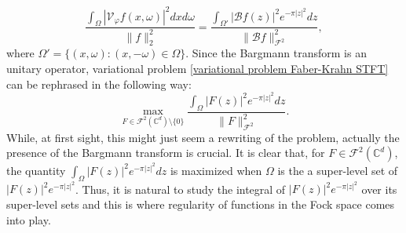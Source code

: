 \documentclass[corpo=11pt, stile=classica, tipotesi=custom,
greek, evenboxes, english]{toptesi}
\numberwithin{equation}{chapter}
\theoremstyle{definition}
\theoremstyle{remark}
\newcommand{\V}{\mathcal{V}} %
\newcommand{\Fock}{\mathcal{F}} %
\newcommand{\C}{\mathbb{C}} %
\newcommand{\Barg}{\mathcal{B}} %
\begin{document}
\begin{equation*}
	\dfrac{\int_{\Omega} |\V_{\varphi} f(x,\omega)|^2 dx d\omega }{\|f\|_2^2} = \dfrac{\int_{\Omega'} |\Barg f (z)|^2 e^{-\pi |z|^2}dz }{\|\Barg f\|_{\Fock^2}^2},
\end{equation*}
where $\Omega' = \{(x, \omega) : (x, -\omega) \in \Omega\}$. Since the Bargmann transform is an unitary operator, variational problem \eqref{variational problem Faber-Krahn STFT} can be rephrased in the following way:
\begin{equation*}
	\max_{F \in \Fock^2(\C^d) \setminus \{0\}} \dfrac{\int_{\Omega} |F(z)|^2 e^{-\pi |z|^2}dz}{\|F\|_{\Fock^2}^2}.
\end{equation*}
While, at first sight, this might just seem a rewriting of the problem, actually the presence of the Bargmann transform is crucial. It is clear that, for $F \in \Fock^2(\C^d)$, the quantity $\int_{\Omega} |F(z)|^2 e^{-\pi |z|^2} dz$ is maximized when $\Omega$ is the a super-level set of $|F(z)|^2 e^{-\pi |z|^2}$. Thus, it is natural to study the integral of $|F(z)|^2 e^{-\pi |z|^2}$ over its super-level sets and this is where regularity of functions in the Fock space comes into play.
\end{document}
